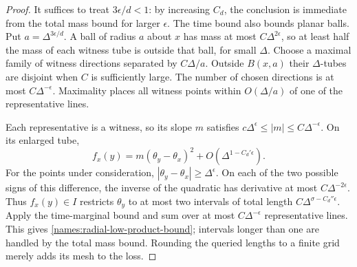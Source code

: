 \begin{proof}
It suffices to treat $3\epsilon/d<1$: by increasing $C_d$,
the conclusion is immediate from the total mass bound for
larger $\epsilon$.
The time bound also bounds planar balls.  Put
$a=\Delta^{3\epsilon/d}$.  A ball of radius $a$ about $x$
has mass at most $C\Delta^{2\epsilon}$, so at least half
the mass of each witness tube is outside that ball, for small
$\Delta$.  Choose a maximal family of witness directions
separated by $C\Delta/a$.  Outside $B(x,a)$ their
$\Delta$-tubes are disjoint when $C$ is sufficiently large.
The number of chosen directions is at most
$C\Delta^{-\epsilon}$.  Maximality places all witness points
within $O(\Delta/a)$ of one of the representative lines.

Each representative is a witness, so its slope $m$ satisfies
$c\Delta^\epsilon\leq|m|\leq C\Delta^{-\epsilon}$.
On its enlarged tube,
\[
 f_x(y)=m(\theta_y-\theta_x)^2
                   +O(\Delta^{1-C_d'\epsilon}).
\]
For the points under consideration,
$|\theta_y-\theta_x|\geq\Delta^\epsilon$.
On each of the two possible signs of this difference, the
inverse of the quadratic has derivative at most
$C\Delta^{-2\epsilon}$.  Thus $f_x(y)\in I$ restricts
$\theta_y$ to at most two intervals of total length
$C\Delta^{\sigma-C_d''\epsilon}$.  Apply the time-marginal
bound and sum over at most $C\Delta^{-\epsilon}$
representative lines.  This gives
\eqref{names:radial-low-product-bound}; intervals longer than
one are handled by the total mass bound.  Rounding the queried
lengths to a finite grid merely adds its mesh to the loss.
\end{proof}


